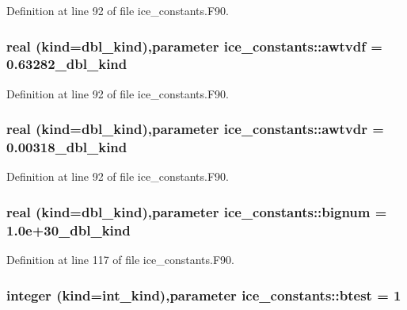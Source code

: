 Definition at line 92 of file ice\_\-constants.F90.\hypertarget{namespaceice__constants_a24c072f6d6610938c97469566905b897}{
\subsubsection[{awtvdf}]{\setlength{\rightskip}{0pt plus 5cm}real (kind=dbl\_\-kind),parameter {\bf ice\_\-constants::awtvdf} = 0.63282\_\-dbl\_\-kind}}
\label{namespaceice__constants_a24c072f6d6610938c97469566905b897}


Definition at line 92 of file ice\_\-constants.F90.\hypertarget{namespaceice__constants_a54bc2a8589e9b5c12512590fc9171b91}{
\subsubsection[{awtvdr}]{\setlength{\rightskip}{0pt plus 5cm}real (kind=dbl\_\-kind),parameter {\bf ice\_\-constants::awtvdr} = 0.00318\_\-dbl\_\-kind}}
\label{namespaceice__constants_a54bc2a8589e9b5c12512590fc9171b91}


Definition at line 92 of file ice\_\-constants.F90.\hypertarget{namespaceice__constants_aec49cf5831029133481512d9f8aed25c}{
\subsubsection[{bignum}]{\setlength{\rightskip}{0pt plus 5cm}real (kind=dbl\_\-kind),parameter {\bf ice\_\-constants::bignum} = 1.0e+30\_\-dbl\_\-kind}}
\label{namespaceice__constants_aec49cf5831029133481512d9f8aed25c}


Definition at line 117 of file ice\_\-constants.F90.\hypertarget{namespaceice__constants_ab190c42f5dcb2a1569301158e2066f5b}{
\subsubsection[{btest}]{\setlength{\rightskip}{0pt plus 5cm}integer (kind=int\_\-kind),parameter {\bf ice\_\-constants::btest} = 1}}
\label{namespaceice__constants_ab190c42f5dcb2a1569301158e2066f5b}


